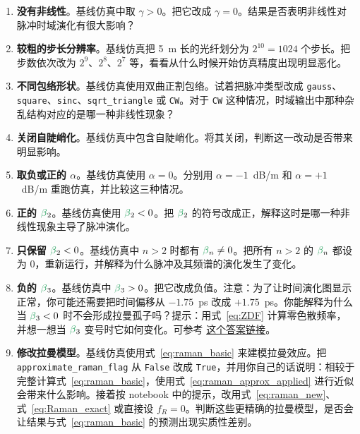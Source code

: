 \begin{enumerate}

\item \textbf{没有非线性}。基线仿真中取 $\gamma>0$。把它改成 $\gamma=0$。结果是否表明非线性对脉冲时域演化有很大影响？

\item \textbf{较粗的步长分辨率}。基线仿真把 5~m 长的光纤划分为 $2^{10}=1024$ 个步长。把步数依次改为 $2^{9}$、$2^{8}$、$2^{7}$ 等，看看从什么时候开始仿真精度出现明显恶化。

\item \textbf{不同包络形状}。基线仿真使用双曲正割包络。试着把脉冲类型改成 \texttt{gauss}、\texttt{square}、\texttt{sinc}、\texttt{sqrt\_triangle} 或 \texttt{CW}。对于 \texttt{CW} 这种情况，时域输出中那种杂乱结构对应的是哪一种非线性现象？

\item \textbf{关闭自陡峭化}。基线仿真中包含自陡峭化。将其关闭，判断这一改动是否带来明显影响。

\item \textbf{取负或正的 $\alpha$}。基线仿真使用 $\alpha=0$。分别用 $\alpha=-1$~dB/m 和 $\alpha=+1$~dB/m 重跑仿真，并比较这三种情况。



\item \textbf{正的 $\betag_2$}。基线仿真使用 $\betag_2<0$。把 $\betag_2$ 的符号改成正，解释这时是哪一种非线性现象主导了脉冲演化。




\item \textbf{只保留 $\betag_2<0$}。基线仿真中 $n>2$ 时都有 $\betag_n\neq0$。把所有 $n>2$ 的 $\betag_n$ 都设为 0，重新运行，并解释为什么脉冲及其频谱的演化发生了变化。

\item \textbf{负的 $\betag_3$}。基线仿真中 $\betag_3>0$。把它改成负值。注意：为了让时间演化图显示正常，你可能还需要把时间偏移从 $-1.75$~ps 改成 $+1.75$~ps。你能解释为什么当 $\betag_3<0$ 时不会形成拉曼孤子吗？提示：用式~\ref{eq:ZDF} 计算零色散频率，并想一想当 $\betag_3$ 变号时它如何变化。可参考 \href{https://github.com/OleKrarup123/NLSE-primer/issues/2}{这个答案链接}。


\item \textbf{修改拉曼模型}。基线仿真使用式~\ref{eq:raman_basic} 来建模拉曼效应。把 \texttt{approximate\_raman\_flag} 从 \texttt{False} 改成 \texttt{True}，并用你自己的话说明：相较于完整计算式~\ref{eq:raman_basic}，使用式~\ref{eq:raman_approx_applied} 进行近似会带来什么影响。接着按 notebook 中的提示，改用式~\ref{eq:raman_new}、式~\ref{eq:Raman_exact} 或直接设 $f_R=0$。判断这些更精确的拉曼模型，是否会让结果与式~\ref{eq:raman_basic} 的预测出现实质性差别。



\end{enumerate}
